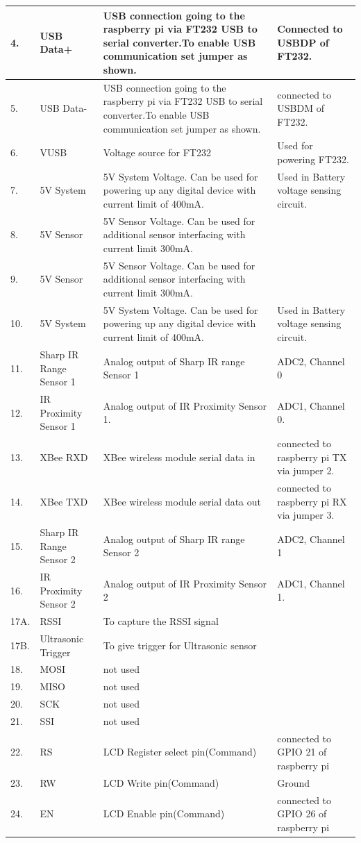 \documentclass[a4paper,12pt,oneside]{book}
\begin{document}
\begin{tabular}{|p{2cm}|p{3cm}|p{6cm}|p{5cm}|}
	\hline
4. &USB Data+ &USB connection going to the raspberry pi via FT232 USB to serial converter.To enable USB communication set jumper as shown.& Connected to USBDP of FT232.  \\ 
\hline

5. &USB Data- &USB connection going to the raspberry pi via FT232 USB to serial converter.To enable USB communication set jumper as shown.& connected to USBDM of FT232. \\ 
\hline

6. &VUSB &Voltage source for FT232& Used for powering FT232. \\ 
\hline
	7. &5V System &5V System Voltage. Can be used for powering up any digital device with current limit of 400mA. & Used in Battery voltage sensing circuit.  \\ 
	\hline
8. &5V Sensor &5V Sensor Voltage. Can be used for additional sensor interfacing with current limit 300mA. &  \\ 
\hline
9. &5V Sensor &5V Sensor Voltage. Can be used for additional sensor interfacing with current limit 300mA.& \\ 
\hline
	10. &5V System &5V System Voltage. Can be used for powering up any digital device with current limit of 400mA. & Used in Battery voltage sensing circuit.  \\ 
\hline
	11. &Sharp IR Range Sensor 1 &Analog output of Sharp IR range Sensor 1& ADC2, Channel 0 \\ 
	\hline
12. &IR Proximity Sensor 1 &Analog output of IR Proximity Sensor 1.& ADC1, Channel 0. \\ 
\hline
	13. &XBee RXD & XBee wireless module serial data in &connected to raspberry pi TX via jumper 2. \\ 
	\hline
14. &XBee TXD & XBee wireless module serial data out &connected to raspberry pi RX via jumper 3.  \\ 
\hline
15. &Sharp IR Range Sensor 2 &Analog output of Sharp IR range Sensor 2& ADC2, Channel 1 \\ 
\hline
16. &IR Proximity Sensor 2 &Analog output of IR Proximity Sensor 2& ADC1, Channel 1. \\ 
\hline
17A. &RSSI &To capture the RSSI signal& \\
\hline
17B.& Ultrasonic Trigger& To give trigger for Ultrasonic sensor& \\
\hline
18.& MOSI & not used & \\
\hline
19.& MISO & not used & \\
\hline
20.& SCK & not used & \\
\hline 
21.& SSI & not used & \\
\hline
22. & RS & LCD Register select pin(Command) &connected to GPIO 21 of raspberry pi\\
\hline
23. & RW & LCD Write pin(Command) & Ground\\
\hline
24. & EN & LCD Enable pin(Command) & connected to GPIO 26 of raspberry pi\\
\hline
\end{tabular}
\end{document}

